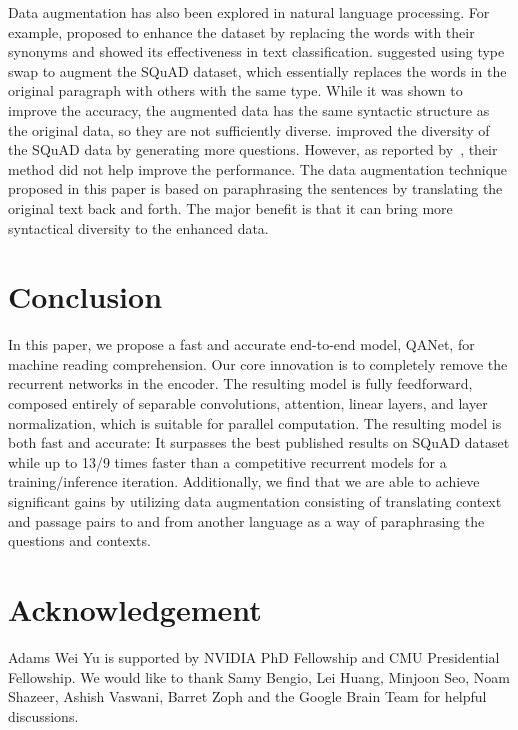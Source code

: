 \documentclass{article} \usepackage{iclr2018_conference,times}
\begin{document}
Data augmentation has also been explored in natural language processing. For example, \cite{ZhangZL15} proposed to enhance the dataset by replacing the words with their synonyms and showed its effectiveness in text classification. \cite{RaimanM17} suggested using type swap to augment the SQuAD dataset, which essentially replaces the words in the original paragraph with others with the same type. While it was shown to improve the accuracy, the augmented data has the same syntactic structure as the original data, so they are not sufficiently diverse. \cite{ZhouYWTBZ17} improved the diversity of the SQuAD data by generating more questions. However, as reported by~\cite{WangYWCZ17}, their method did not help improve the performance. The data augmentation technique proposed in this paper is based on paraphrasing the sentences by translating the original text back and forth. The major benefit is that it can bring more syntactical diversity to the enhanced data.


%
 \section{Conclusion}\label{sec:conclusion}

In this paper, we propose a fast and accurate end-to-end model, QANet, for machine reading comprehension. Our core innovation is to completely remove the recurrent networks in the encoder. The resulting model is fully feedforward, composed entirely of separable convolutions, attention, linear layers, and layer normalization, which is suitable for parallel computation.  The resulting model is both fast and accurate: It surpasses the best published results on SQuAD dataset while up to 13/9 times faster than a competitive recurrent models for a training/inference iteration.  Additionally, we find that we are able to achieve significant gains by utilizing data augmentation consisting of translating context and passage pairs to and from another language as a way of paraphrasing the questions and contexts. 
%
 \section*{Acknowledgement}
Adams Wei Yu is supported by NVIDIA PhD Fellowship and CMU Presidential Fellowship. We would like to thank Samy Bengio, Lei Huang, Minjoon Seo, Noam Shazeer, Ashish Vaswani, Barret Zoph and the Google Brain Team for helpful discussions.





\end{document}
